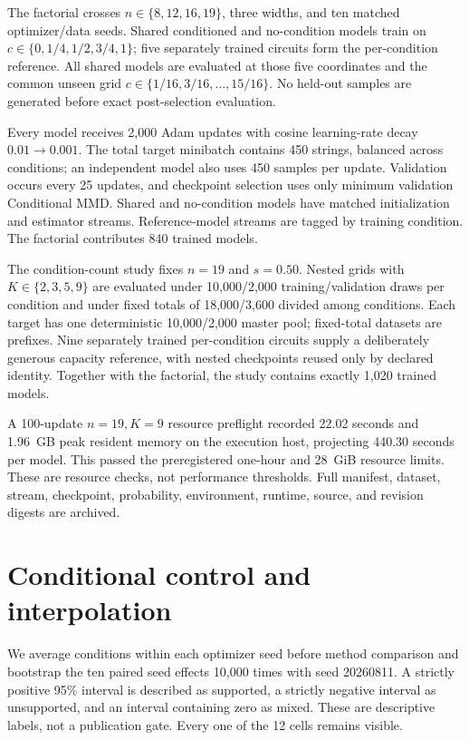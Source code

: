 \documentclass[a4paper,twocolumn,11pt,unpublished]{quantumarticle}
\begin{document}
The factorial crosses $n\in\{8,12,16,19\}$, three widths, and ten matched
optimizer/data seeds.  Shared conditioned and no-condition models train on
$c\in\{0,1/4,1/2,3/4,1\}$; five separately trained circuits form the
per-condition reference.  All shared models are evaluated at those
five coordinates and the
common unseen grid $c\in\{1/16,3/16,\ldots,15/16\}$.  No held-out samples are
generated before exact post-selection evaluation.

Every model receives 2,000 Adam updates with cosine learning-rate decay
$0.01\rightarrow0.001$.  The total target minibatch contains 450 strings,
balanced across conditions; an independent model also uses 450 samples per
update.  Validation occurs every 25 updates, and checkpoint selection uses
only minimum validation Conditional MMD.  Shared and no-condition models have
matched initialization and estimator streams.  Reference-model streams are
tagged by training condition.  The factorial contributes 840 trained models.

The condition-count study fixes $n=19$ and $s=0.50$.  Nested grids with
$K\in\{2,3,5,9\}$ are evaluated under 10,000/2,000 training/validation draws
per condition and under fixed totals of 18,000/3,600 divided among
conditions.  Each target has one deterministic 10,000/2,000 master pool;
fixed-total datasets
are prefixes.  Nine separately trained per-condition circuits supply a
deliberately generous capacity reference, with nested checkpoints reused only
by declared identity.  Together with the factorial, the study contains exactly
1,020 trained models.

A 100-update $n=19,K=9$ resource preflight recorded 22.02 seconds and
1.96~GB peak resident memory on the execution host, projecting 440.30 seconds
per model.  This passed the preregistered one-hour and 28~GiB resource limits.
These are resource checks, not performance thresholds.  Full manifest,
dataset, stream, checkpoint, probability, environment, runtime, source, and
revision digests are archived.

\section{Conditional control and interpolation}
\label{sec:headline}

We average conditions within each optimizer seed before method comparison and
bootstrap the ten paired seed effects 10,000 times with seed 20260811.  A
strictly positive 95\% interval is described as supported, a strictly negative
interval as unsupported, and an interval containing zero as mixed.  These are
descriptive labels, not a publication gate.  Every one of the 12 cells remains
visible.
\end{document}
